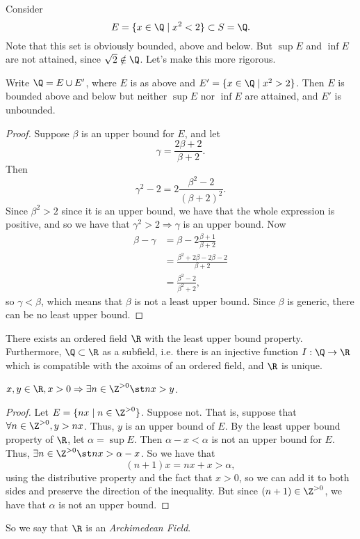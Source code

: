 \documentclass{notes}
\begin{document}
Consider $$E = \{x\in\Q \mid x^2 < 2 \} \subset S = \Q.$$ Note that this set is obviously bounded, above
and below. But $\sup E$ and $\inf E$ are not attained, since $\sqrt{2}\notin\Q$. Let's make this more
rigorous. \\

\begin{proposition}
  Write $\Q = E\cup E'$, where $E$ is as above and $E' = \{x\in\Q \mid x^2 > 2\}$. Then $E$ is bounded
  above and below but neither $\sup E$ nor $\inf E$ are attained, and $E'$ is unbounded.
\end{proposition}

\begin{proof}
  Suppose $\beta$ is an upper bound for $E$, and let $$\gamma = \frac{2\beta + 2}{\beta + 2}.$$ Then
  $$\gamma^2 - 2 = 2\frac{\beta^2 - 2}{(\beta + 2)^2}.$$ Since $\beta^2 > 2$ since it is an upper bound,
  we have that the whole expression is positive, and so we have that $\gamma^2 > 2 \Rightarrow \gamma$ is 
  an upper bound. Now 
  \begin{align*}
    \beta - \gamma &= \beta - 2\frac{\beta + 1}{\beta + 2} \\
                   &= \frac{\beta^2 + 2\beta - 2\beta - 2}{\beta + 2} \\
                   &= \frac{\beta^2 - 2}{\beta^2 + 2},
  \end{align*}
  so $\gamma < \beta$, which means that $\beta$ is not a least upper bound. Since $\beta$ is generic,
  there can be no least upper bound.
\end{proof}

\begin{theorem}
  There exists an ordered field $\R$ with the least upper bound property. Furthermore, $\Q\subset\R$
  as a subfield, i.e. there is an injective function $I:\Q\to\R$ which is compatible with the axoims
  of an ordered field, and $\R$ is unique.
\end{theorem}

\begin{theorem}
  $x,y\in\R, x > 0 \Rightarrow \exists n\in\Z^{>0} \st nx > y$.
\end{theorem}
\begin{proof}
  Let $E = \{nx\mid n\in\Z^{>0}\}$. Suppose not. That is, suppose that $\forall n\in\Z^{>0}, y > nx$. 
  Thus, $y$ is an upper bound of $E$. By the least upper bound property of $\R$, let $\alpha = \sup E$.
  Then $\alpha - x < \alpha$ is not an upper bound for $E$. Thus, $\exists n\in\Z^{>0}\st nx > \alpha
  - x$. So we have that $$(n+1)x = nx + x > \alpha,$$ using the distributive property and the fact that
  $x > 0$, so we can add it to both sides and preserve the direction of the inequality. But since 
  $(n+1)\in\Z^{>0}$, we have that $\alpha$ is not an upper bound. 
\end{proof}
So we say that $\R$ is an \emph{Archimedean Field}.
\end{document}
